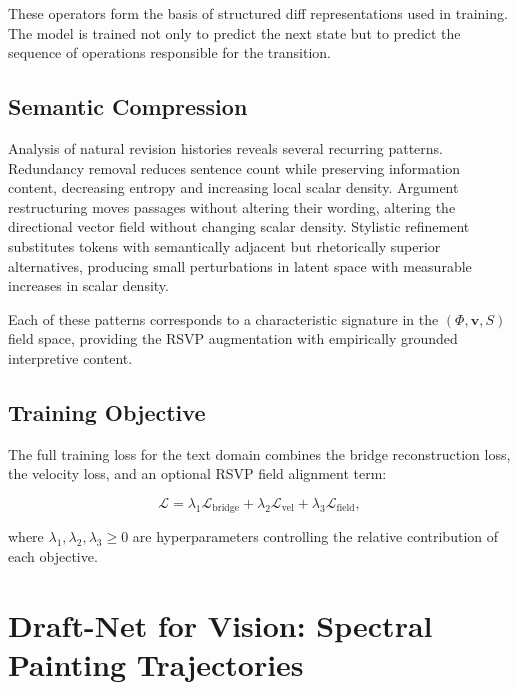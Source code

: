 \documentclass[12pt,a4paper]{article}
\theoremstyle{draftthm}
\begin{document}
These operators form the basis of structured diff representations used in training. The model is trained not only to predict the next state but to predict the sequence of operations responsible for the transition.

\subsection{Semantic Compression}

Analysis of natural revision histories reveals several recurring patterns. Redundancy removal reduces sentence count while preserving information content, decreasing entropy and increasing local scalar density. Argument restructuring moves passages without altering their wording, altering the directional vector field without changing scalar density. Stylistic refinement substitutes tokens with semantically adjacent but rhetorically superior alternatives, producing small perturbations in latent space with measurable increases in scalar density.

Each of these patterns corresponds to a characteristic signature in the $(\Phi, \mathbf{v}, S)$ field space, providing the RSVP augmentation with empirically grounded interpretive content.

\subsection{Training Objective}

The full training loss for the text domain combines the bridge reconstruction loss, the velocity loss, and an optional RSVP field alignment term:

\begin{equation}
  \mathcal{L}
  =
  \lambda_1 \mathcal{L}_{\mathrm{bridge}}
  +
  \lambda_2 \mathcal{L}_{\mathrm{vel}}
  +
  \lambda_3 \mathcal{L}_{\mathrm{field}},
  \label{eq:combined-loss}
\end{equation}

where $\lambda_1, \lambda_2, \lambda_3 \geq 0$ are hyperparameters controlling the relative contribution of each objective.

\section{Draft-Net for Vision: Spectral Painting Trajectories}
\end{document}
